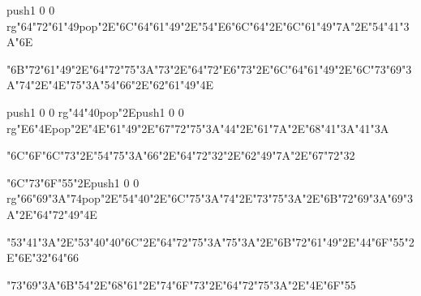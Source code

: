 \vfill\eject
\null\vfill
\centerline{\pdfcolorstack\match push{1 0 0 rg}\ipa\char"64\ipa\char"72\ipa\char"61\ipa\char"49\pdfcolorstack\match pop{}\ipa\char"2E\ipa\char"6C\ipa\char"64\ipa\char"61\ipa\char"49\ipa\char"2E\ipa\char"54\ipa\char"E6\ipa\char"6C\ipa\char"64\ipa\char"2E\ipa\char"6C\ipa\char"61\ipa\char"49\ipa\char"7A\ipa\char"2E\ipa\char"54\ipa\char"41\ipa\char"3A\ipa\char"6E}\bigskip
\centerline{\ipa\char"6B\ipa\char"72\ipa\char"61\ipa\char"49\ipa\char"2E\ipa\char"64\ipa\char"72\ipa\char"75\ipa\char"3A\ipa\char"73\ipa\char"2E\ipa\char"64\ipa\char"72\ipa\char"E6\ipa\char"73\ipa\char"2E\ipa\char"6C\ipa\char"64\ipa\char"61\ipa\char"49\ipa\char"2E\ipa\char"6C\ipa\char"73\ipa\char"69\ipa\char"3A\ipa\char"74\ipa\char"2E\ipa\char"4E\ipa\char"75\ipa\char"3A\ipa\char"54\ipa\char"66\ipa\char"2E\ipa\char"62\ipa\char"61\ipa\char"49\ipa\char"4E}\bigskip
\centerline{\pdfcolorstack\match push{1 0 0 rg}\ipa\char"44\ipa\char"40\pdfcolorstack\match pop{}\ipa\char"2E\pdfcolorstack\match push{1 0 0 rg}\ipa\char"E6\ipa\char"4E\pdfcolorstack\match pop{}\ipa\char"2E\ipa\char"4E\ipa\char"61\ipa\char"49\ipa\char"2E\ipa\char"67\ipa\char"72\ipa\char"75\ipa\char"3A\ipa\char"44\ipa\char"2E\ipa\char"61\ipa\char"7A\ipa\char"2E\ipa\char"68\ipa\char"41\ipa\char"3A\ipa\char"41\ipa\char"3A}
\vfill\eject
\null\vfill
\centerline{\ipa\char"6C\ipa\char"6F\ipa\char"6C\ipa\char"73\ipa\char"2E\ipa\char"54\ipa\char"75\ipa\char"3A\ipa\char"66\ipa\char"2E\ipa\char"64\ipa\char"72\ipa\char"32\ipa\char"2E\ipa\char"62\ipa\char"49\ipa\char"7A\ipa\char"2E\ipa\char"67\ipa\char"72\ipa\char"32}\bigskip
\centerline{\ipa\char"6C\ipa\char"73\ipa\char"6F\ipa\char"55\ipa\char"2E\pdfcolorstack\match push{1 0 0 rg}\ipa\char"66\ipa\char"69\ipa\char"3A\ipa\char"74\pdfcolorstack\match pop{}\ipa\char"2E\ipa\char"54\ipa\char"40\ipa\char"2E\ipa\char"6C\ipa\char"75\ipa\char"3A\ipa\char"74\ipa\char"2E\ipa\char"73\ipa\char"75\ipa\char"3A\ipa\char"2E\ipa\char"6B\ipa\char"72\ipa\char"69\ipa\char"3A\ipa\char"69\ipa\char"3A\ipa\char"2E\ipa\char"64\ipa\char"72\ipa\char"49\ipa\char"4E}\bigskip
\centerline{\ipa\char"53\ipa\char"41\ipa\char"3A\ipa\char"2E\ipa\char"53\ipa\char"40\ipa\char"40\ipa\char"6C\ipa\char"2E\ipa\char"64\ipa\char"72\ipa\char"75\ipa\char"3A\ipa\char"75\ipa\char"3A\ipa\char"2E\ipa\char"6B\ipa\char"72\ipa\char"61\ipa\char"49\ipa\char"2E\ipa\char"44\ipa\char"6F\ipa\char"55\ipa\char"2E\ipa\char"6E\ipa\char"32\ipa\char"64\ipa\char"66}
\vfill\eject
\null\vfill
\centerline{\ipa\char"73\ipa\char"69\ipa\char"3A\ipa\char"6B\ipa\char"54\ipa\char"2E\ipa\char"68\ipa\char"61\ipa\char"2E\ipa\char"74\ipa\char"6F\ipa\char"73\ipa\char"2E\ipa\char"64\ipa\char"72\ipa\char"75\ipa\char"3A\ipa\char"2E\ipa\char"4E\ipa\char"6F\ipa\char"55}\bigskip
